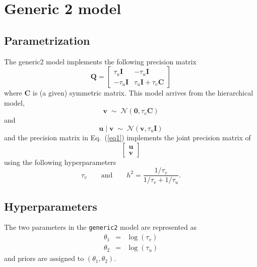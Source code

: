 \documentclass[a4paper,11pt]{article}
\def\mm#1{\ensuremath{\boldsymbol{#1}}} %
\begin{document}
\section*{Generic 2 model}

\subsection*{Parametrization}

The generic2 model implements the following precision matrix
\begin{equation}\label{eq1}%
    \mathbf{Q}=
    \begin{bmatrix}
        \tau_{u} \mm{I} & -\tau_{u}\mm{I} \\
        -\tau_{u}\mm{I} & \tau_{u}\mm{I} + \tau_{v} \mm{C}
    \end{bmatrix}
\end{equation}
where $\mathbf{C}$ is (a given) symmetric matrix. This model arrives from the
hierarchical model,
\begin{displaymath}
    \mm{v} \;\sim\; {\mathcal N}(\mm{0}, \tau_v \mm{C})
\end{displaymath}
and
\begin{displaymath}
    \mm{u}\mid \mm{v} \;\sim\; {\mathcal N}(\mm{v}, \tau_{u} \mm{I})
\end{displaymath}
and the precision matrix in Eq.~(\ref{eq1}) implements the joint
precision matrix of
\begin{displaymath}
    \begin{bmatrix}
        \mm{u}\\
        \mm{v}
    \end{bmatrix}
\end{displaymath}
using the following hyperparameters
\begin{displaymath}
    \tau_{v}\qquad\text{and}\qquad   h^{2} = \frac{1/\tau_{v}}{1/\tau_{v} + 1/\tau_{u}}.
\end{displaymath}


\subsection*{Hyperparameters}

The two parameters in the \texttt{generic2} model are represented as
\begin{eqnarray*}
    \theta_1 &= & \log(\tau_{v})\\
    \theta_2 &=& \log(\tau_{u}) 
\end{eqnarray*}
and priors are assigned to $(\theta_1,\theta_2)$.
\end{document}
